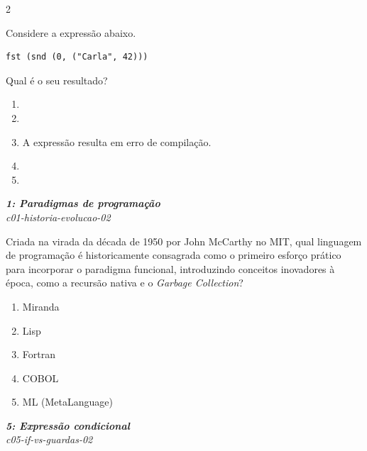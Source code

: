 \documentclass[a4paper,10pt,brazil]{article}
\begin{document}
\begin{multicols}{2}
\begin{flushright}
\end{flushright}
Considere a expressão abaixo.
\begin{verbatim}
fst (snd (0, ("Carla", 42)))
\end{verbatim}
Qual é o seu resultado?

\begin{enumerate}
  \item {}

  \item {}

  \item A expressão resulta em erro de compilação.

  \item {}

  \item {}


\end{enumerate}

\begin{flushright}
  \footnotesize
  \textit{\textbf{1: Paradigmas de programação}}\\
  \textit{c01-historia-evolucao-02}\\

\end{flushright}
Criada na virada da década de 1950 por John McCarthy no MIT, qual linguagem de programação é historicamente consagrada como o primeiro esforço prático para incorporar o paradigma funcional, introduzindo conceitos inovadores à época, como a recursão nativa e o \emph{Garbage Collection}?

\begin{enumerate}
  \item Miranda

  \item Lisp

  \item Fortran

  \item COBOL

  \item ML (MetaLanguage)


\end{enumerate}

\begin{flushright}
  \footnotesize
  \textit{\textbf{5: Expressão condicional}}\\
  \textit{c05-if-vs-guardas-02}\\


\end{flushright}
\end{multicols}
\end{document}
